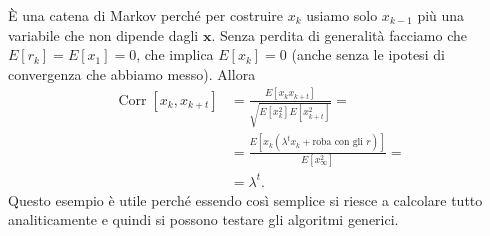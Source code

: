 \begin{solution}
    È una catena di Markov perché per costruire $x_k$ usiamo solo $x_{k-1}$ più
    una variabile che non dipende dagli $\mathbf x$. Senza perdita di
    generalità facciamo che $E[r_k] = E[x_1] = 0$, che implica $E[x_k] = 0$
    (anche senza le ipotesi di convergenza che abbiamo messo). Allora
    \begin{align*}
        \operatorname{Corr}[x_k, x_{k+t}]
        &= \frac {E[x_k x_{k+t}]} {\sqrt{E[x_k^2] E[x_{k+t}^2]}} = \\
        &= \frac {E[x_k (\lambda^t x_k + \text{roba con gli $r$})]}
        {E[x_\infty^2]} = \\
        &= \lambda^t.
    \end{align*}
    Questo esempio è utile perché essendo così semplice si riesce a calcolare
    tutto analiticamente e quindi si possono testare gli algoritmi generici.
\end{solution}

